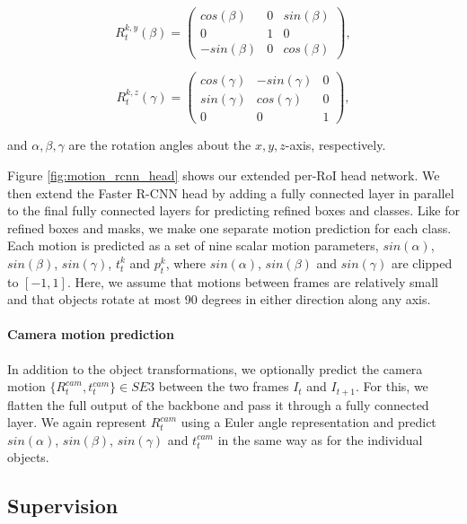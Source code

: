 \begin{equation}
R_t^{k,y}(\beta) =
\begin{pmatrix}
  cos(\beta) & 0 & sin(\beta) \\
  0 & 1 & 0 \\
  -sin(\beta) & 0 & cos(\beta)
\end{pmatrix},
\end{equation}

\begin{equation}
R_t^{k,z}(\gamma) =
\begin{pmatrix}
  cos(\gamma) & -sin(\gamma) & 0 \\
  sin(\gamma) & cos(\gamma) & 0 \\
  0 & 0 & 1
\end{pmatrix},
\end{equation}

and $\alpha, \beta, \gamma$ are the rotation angles about the $x,y,z$-axis, respectively.


Figure \ref{fig:motion_rcnn_head} shows our extended per-RoI head network.
We then extend the Faster R-CNN head by adding a fully connected layer in parallel to the final fully connected layers for
predicting refined boxes and classes.
Like for refined boxes and masks, we make one separate motion prediction for each class.
Each motion is predicted as a set of nine scalar motion parameters,
$sin(\alpha)$, $sin(\beta)$, $sin(\gamma)$, $t_t^k$ and $p_t^k$,
where $sin(\alpha)$, $sin(\beta)$ and $sin(\gamma)$ are clipped to $[-1, 1]$.
Here, we assume that motions between frames are relatively small
and that objects rotate at most 90 degrees in either direction along any axis.

\paragraph{Camera motion prediction}
In addition to the object transformations, we optionally predict the camera motion $\{R_t^{cam}, t_t^{cam}\}\in SE3$
between the two frames $I_t$ and $I_{t+1}$.
For this, we flatten the full output of the backbone and pass it through a fully connected layer.
We again represent $R_t^{cam}$ using a Euler angle representation and
predict $sin(\alpha)$, $sin(\beta)$, $sin(\gamma)$ and $t_t^{cam}$ in the same way as for the individual objects.

\subsection{Supervision}

